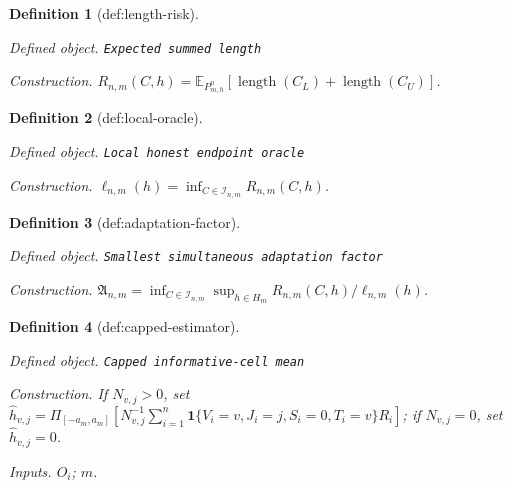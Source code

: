\documentclass{article}
\newtheorem{definition}{Definition}
\begin{document}
\begin{definition}[def:length-risk]\label{def:length-risk}
\par\smallskip\noindent\emph{Defined object.} \texttt{Expected summed length}
\par\smallskip\noindent\emph{Construction.} \(R_{n,m}(C,h)=\mathbb E_{P_{m,h}^{n}}[\operatorname{length}(C_L)+\operatorname{length}(C_U)]\).
\end{definition}

\begin{definition}[def:local-oracle]\label{def:local-oracle}
\par\smallskip\noindent\emph{Defined object.} \texttt{Local honest endpoint oracle}
\par\smallskip\noindent\emph{Construction.} \(\ell_{n,m}(h)=\inf_{C\in\mathcal I_{n,m}}R_{n,m}(C,h)\).
\end{definition}

\begin{definition}[def:adaptation-factor]\label{def:adaptation-factor}
\par\smallskip\noindent\emph{Defined object.} \texttt{Smallest simultaneous adaptation factor}
\par\smallskip\noindent\emph{Construction.} \(\mathfrak A_{n,m}=\inf_{C\in\mathcal I_{n,m}}\sup_{h\in H_m}R_{n,m}(C,h)/\ell_{n,m}(h)\).
\end{definition}

\begin{definition}[def:capped-estimator]\label{def:capped-estimator}
\par\smallskip\noindent\emph{Defined object.} \texttt{Capped informative-\allowbreak{}cell mean}
\par\smallskip\noindent\emph{Construction.} If \(N_{v,j}>0\), set \(\widehat h_{v,j}=\Pi_{[-a_m,a_m]}\left[N_{v,j}^{-1}\sum_{i=1}^{n}\mathbf1\{V_i=v,J_i=j,S_i=0,T_i=v\}R_i\right]\); if \(N_{v,j}=0\), set \(\widehat h_{v,j}=0\).
\par\smallskip\noindent\emph{Inputs.} \(O_i\); \(m\).
\end{definition}
\end{document}
